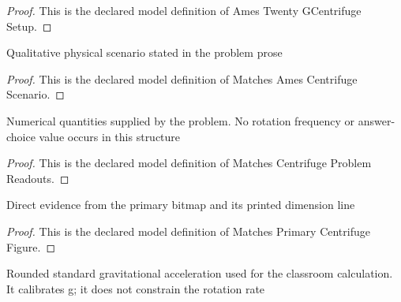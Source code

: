 \begin{proof}
  This is the declared model definition of Ames Twenty GCentrifuge Setup.
\end{proof}
\begin{definition}
  \label{def:physics:phyx-mini-0687:phyxminiproblems-problemphyxmini0687-matchesamescentrifugescenario}
  Qualitative physical scenario stated in the problem prose
\end{definition}
\begin{proof}
  This is the declared model definition of Matches Ames Centrifuge Scenario.
\end{proof}
\begin{definition}
  \label{def:physics:phyx-mini-0687:phyxminiproblems-problemphyxmini0687-matchescentrifugeproblemreadouts}
  Numerical quantities supplied by the problem. No rotation frequency or answer-choice value occurs in this structure
\end{definition}
\begin{proof}
  This is the declared model definition of Matches Centrifuge Problem Readouts.
\end{proof}
\begin{definition}
  \label{def:physics:phyx-mini-0687:phyxminiproblems-problemphyxmini0687-matchesprimarycentrifugefigure}
  Direct evidence from the primary bitmap and its printed dimension line
\end{definition}
\begin{proof}
  This is the declared model definition of Matches Primary Centrifuge Figure.
\end{proof}
\begin{definition}
  \label{def:physics:phyx-mini-0687:phyxminiproblems-problemphyxmini0687-usesroundedstandardgravity}
  Rounded standard gravitational acceleration used for the classroom calculation. It calibrates g; it does not constrain the rotation rate
\end{definition}
